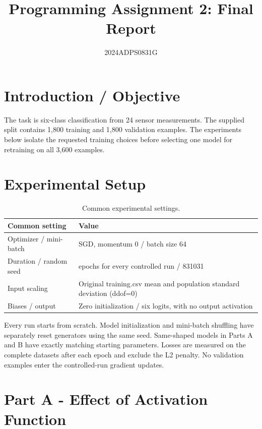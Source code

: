 \documentclass[11pt,a4paper]{article}
\begin{document}
\title{Programming Assignment 2: Final Report}
\author{2024ADPS0831G}
\date{}
\maketitle

\section{Introduction / Objective}

The task is six-class classification from 24 sensor measurements. The supplied split contains 1,800 training and 1,800 validation examples. The experiments below isolate the requested training choices before selecting one model for retraining on all 3,600 examples.


\section{Experimental Setup}

\begin{table}[htbp]
\centering
\setlength{\tabcolsep}{4pt}
\renewcommand{\arraystretch}{1.12}
\normalsize
\begin{tabular}{@{}>{\raggedright\arraybackslash}p{117.04pt} >{\raggedright\arraybackslash}p{326.23pt}@{}}
\hline
Common setting & Value \\
\hline
Optimizer / mini-batch & SGD, momentum 0 / batch size 64 \\
Duration / random seed & 120 epochs for every controlled run / 831031 \\
Input scaling & Original training.csv mean and population standard deviation (ddof=0) \\
Biases / output & Zero initialization / six logits, with no output activation \\
\hline
\end{tabular}
\caption{Common experimental settings.}
\end{table}

Every run starts from scratch. Model initialization and mini-batch shuffling have separately reset generators using the same seed. Same-shaped models in Parts A and B have exactly matching starting parameters. Losses are measured on the complete datasets after each epoch and exclude the L2 penalty. No validation examples enter the controlled-run gradient updates.


\section{Part A - Effect of Activation Function}
\end{document}
